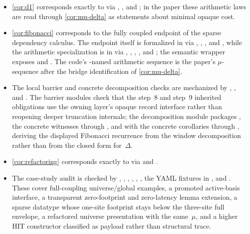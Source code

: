 \documentclass{lmcs}
\begin{document}
{\begin{itemize}[nosep]
\item \autoref{cor:d1} corresponds exactly to  via , , and ; in the paper these arithmetic laws are read through \autoref{cor:mu-delta} as statements about minimal opaque cost.
\item \autoref{cor:fibonacci} corresponds to the fully coupled endpoint of the sparse dependency calculus. The endpoint itself is formalized in  via , , , and , while the arithmetic specialization is in  via , , , , and ; the semantic wrapper exposes  and . The code's -named arithmetic sequence is the paper's $\mu$-sequence after the bridge identification of \autoref{cor:mu-delta}.
\item The local barrier and concrete decomposition checks are mechanized by , , and . The barrier modules check that the step~8 and step~9 inherited obligations use the owning layer's opaque record interface rather than reopening deeper truncation internals; the decomposition module packages , the concrete witnesses  through , and  with the concrete corollaries  through , deriving the displayed Fibonacci recurrence from the window decomposition rather than from the closed form for~$\Delta$.
\item \autoref{cor:refactoring} corresponds exactly to  via  and .
\item The case-study audit is checked by , , , , , , the YAML fixtures in , and . These cover full-coupling universe/global examples, a promoted active-basis interface, a transparent zero-footprint and zero-latency lemma extension, a sparse datatype whose one-site footprint stays below the three-site full envelope, a refactored universe presentation with the same~$\mu$, and a higher HIT constructor classified as payload rather than structural trace.
\end{itemize}
}
\end{document}
